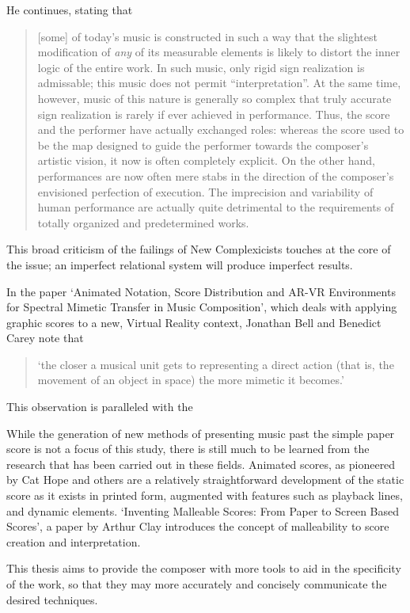 He continues, stating that \begin{quotation}
    [some] of today's music is constructed in such a way that the slightest modification of \emph{any} of its measurable elements is likely to distort the inner logic of the entire work.
    In such music, only rigid sign realization is admissable; this music does not permit ``interpretation''. 
    At the same time, however, music of this nature is generally so complex that truly accurate sign realization is rarely if ever achieved in performance.
    Thus, the score and the performer have actually exchanged roles: whereas the score used to be the map designed to guide the performer towards the composer's artistic vision, it now is often completely explicit.
    On the other hand, performances are now often mere stabs in the direction of the composer's envisioned perfection of execution.
    The imprecision and variability of human performance are actually quite detrimental to the requirements of totally organized and predetermined works.\autocite[30--31]{stoneProblemsMethodsNotation1963}
\end{quotation}

This broad criticism of the failings of New Complexicists touches at the core of the issue; an imperfect relational system will produce imperfect results.

In the paper `Animated Notation, Score Distribution and AR-VR Environments for Spectral Mimetic Transfer in Music Composition', which deals with applying graphic scores to a new, Virtual Reality context, Jonathan Bell and Benedict Carey note that \begin{quotation}
    `the closer a musical unit gets to representing a direct action (that is, the movement of an object in space) the more mimetic it becomes.'\autocite[]{bellANIMATEDNOTATIONSCORE2019}
\end{quotation} This observation is paralleled with the 

While the generation of new methods of presenting music past the simple paper score is not a focus of this study, there is still much to be learned from the research that has been carried out in these fields.
Animated scores, as pioneered by Cat Hope and others are a relatively straightforward development of the static score as it exists in printed form, augmented with features such as playback lines, and dynamic elements.
`Inventing Malleable Scores: From Paper to Screen Based Scores', a paper by Arthur Clay introduces the concept of malleability to score creation and interpretation.

This thesis aims to provide the composer with more tools to aid in the specificity of the work, so that they may more accurately and concisely communicate the desired techniques.